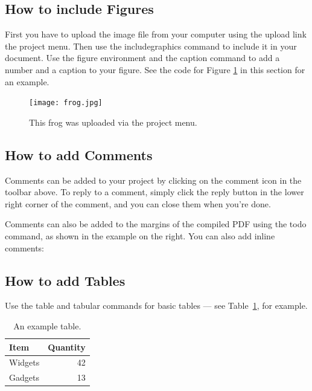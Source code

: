\documentclass[a4paper]{article}
\begin{document}
\subsection{How to include Figures}

First you have to upload the image file from your computer using the upload link the project menu. Then use the includegraphics command to include it in your document. Use the figure environment and the caption command to add a number and a caption to your figure. See the code for Figure \ref{fig:frog} in this section for an example.

\begin{figure}
\centering
\texttt{[image: frog.jpg]}
\caption{\label{fig:frog}This frog was uploaded via the project menu.}
\end{figure}

\subsection{How to add Comments}

Comments can be added to your project by clicking on the comment icon in the toolbar above. %
%
%
To reply to a comment, simply click the reply button in the lower right corner of the comment, and you can close them when you're done.

Comments can also be added to the margins of the compiled PDF using the todo command, as shown in the example on the right. You can also add inline comments:


\subsection{How to add Tables}

Use the table and tabular commands for basic tables --- see Table~\ref{tab:widgets}, for example. 

\begin{table}
\centering
\begin{tabular}{l|r}
Item & Quantity \\\hline
Widgets & 42 \\
Gadgets & 13
\end{tabular}
\caption{\label{tab:widgets}An example table.}
\end{table}
\end{document}
